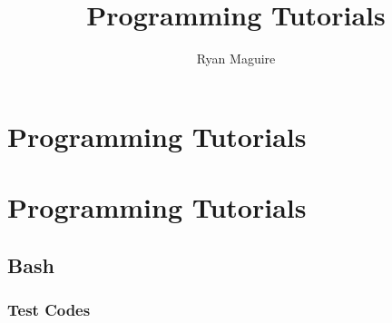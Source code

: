 \documentclass[crop=false,class=book,oneside]{standalone}
\begin{document}
    \ifx\ifcoursesother\undefined
        \title{Programming Tutorials}
        \author{Ryan Maguire}
        \date{\vspace{-5ex}}
        \maketitle
        \tableofcontents
        \clearpage
        \chapter*{Programming Tutorials}
        \setcounter{chapter}{1}
    \else
        \chapter{Programming Tutorials}
    \fi
    \section{Bash}
        \subsection{Test Codes}
\end{document}
